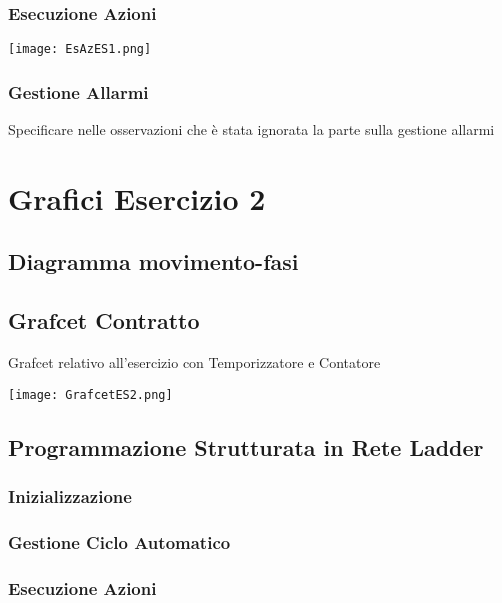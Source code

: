 \documentclass[a4paper]{article}
\begin{document}
\subsubsection{Esecuzione Azioni}
\begin{center}
\texttt{[image: EsAzES1.png]}
\end{center}
\subsubsection{Gestione Allarmi}
Specificare nelle osservazioni che è stata ignorata la parte sulla gestione allarmi
\clearpage

\section{Grafici Esercizio 2}

\subsection{Diagramma movimento-fasi}
\subsection{Grafcet Contratto}
Grafcet relativo all'esercizio con Temporizzatore e Contatore
\begin{center}
\texttt{[image: GrafcetES2.png]}
\end{center}

\subsection{Programmazione Strutturata in Rete Ladder}
\subsubsection{Inizializzazione}
\subsubsection{Gestione Ciclo Automatico}
\begin{center}
\end{center}
\subsubsection{Esecuzione Azioni}
\begin{center}
\end{center}
\end{document}
